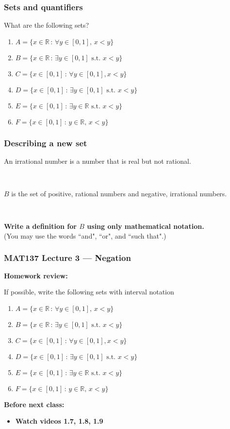 \documentclass[14pt]{beamer}
\newcommand {\DS} [1] {${\displaystyle #1}$}
\newcommand {\R}{\mathbb{R}}
\begin{document}
\begin{frame}
\frametitle{Sets and quantifiers}

What are the following sets?

	\begin{enumerate}
		\item  \DS{A = \{ x \in \R \, : \, \forall y \in [0,1], \, x < y \} }
		\item  \DS{B = \{ x \in \R \, : \, \exists y \in [0,1] \mbox{ s.t. } x < y \} }
		\item  \DS{C = \{ x \in [0,1] \, : \, \forall y \in [0,1], x < y \} }
		\item  \DS{D = \{ x \in [0,1] \, : \, \exists y \in [0,1] \mbox{ s.t. } x < y \} }
		\item  \DS{E = \{ x \in [0,1] \, : \, \exists y \in \R \mbox{ s.t. } x < y \} }
		\item  \DS{F = \{ x \in [0,1] \, : \, y \in \R, \, x < y \} } 
	\end{enumerate}
\end{frame}

\begin{frame}
\frametitle{Describing a new set}

An irrational number is a number that is real but not rational.

\


$B$ is the set of positive, rational numbers and negative, irrational numbers.

\

	{\bfseries Write a definition for $B$ using only mathematical notation.} \\
 (You may use the words ``and", ``or", and ``such that".)
 \end{frame}

\begin{frame}
\frametitle{MAT137 Lecture 3 --- Negation}
	\textbf{Homework review:}
	\vfill

	If possible, write the following sets with interval notation
	\begin{enumerate}
		\item  \DS{A = \{ x \in \R \, : \, \forall y \in [0,1], \, x < y \} }
		\item  \DS{B = \{ x \in \R \, : \, \exists y \in [0,1] \mbox{ s.t. } x < y \} }
		\item  \DS{C = \{ x \in [0,1] \, : \, \forall y \in [0,1], x < y \} }
		\item  \DS{D = \{ x \in [0,1] \, : \, \exists y \in [0,1] \mbox{ s.t. } x < y \} }
		\item  \DS{E = \{ x \in [0,1] \, : \, \exists y \in \R \mbox{ s.t. } x < y \} }
		\item  \DS{F = \{ x \in [0,1] \, : \, y \in \R, \, x < y \} } 
	\end{enumerate}


	\vfill
	{\bf Before next class:}
		\begin{itemize} \normalsize
			\item {\bf Watch videos 1.7, 1.8, 1.9 }
		\end{itemize}
	\vfill

\end{frame}
\end{document}
